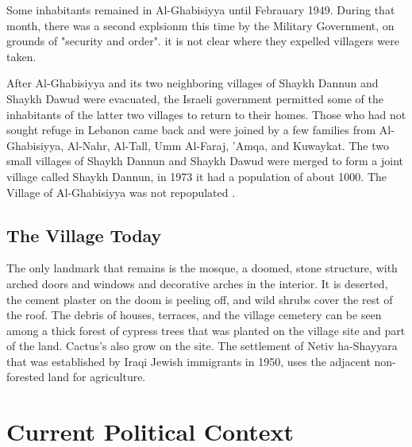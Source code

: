 Some inhabitants remained in Al-Ghabisiyya until Febrauary 1949. During that month, there was a second explsionm this time by the Military Government, on grounds of "security and order". it is not clear where they expelled villagers were taken\citep{Morris2004}.

After Al-Ghabisiyya and its two neighboring villages of Shaykh Dannun and Shaykh Dawud were evacuated, the Israeli government permitted some of the inhabitants of the latter two villages to return to their homes. Those who had not sought refuge in Lebanon came back and were joined by a few families from Al-Ghabisiyya, Al-Nahr, Al-Tall, Umm Al-Faraj, 'Amqa, and Kuwaykat. The two small villages of Shaykh Dannun and Shaykh Dawud were merged to form a joint village called Shaykh Dannun, in 1973 it had a population of about 1000. The Village of Al-Ghabisiyya was not repopulated \citep{Khalidi2015}.  

\subsection{The Village Today}

The only landmark that remains is the mosque, a doomed, stone structure, with arched doors and windows and decorative arches in the interior. It is deserted, the cement plaster on the doom is peeling off, and wild shrubs cover the rest of the roof. The debris of houses, terraces, and the village cemetery can be seen among a thick forest of cypress trees that was planted on the village site and part of the land. Cactus's also grow on the site. The settlement of Netiv ha-Shayyara that was established by Iraqi Jewish immigrants in 1950, uses the adjacent non-forested land for agriculture.    
\section{Current Political Context}


